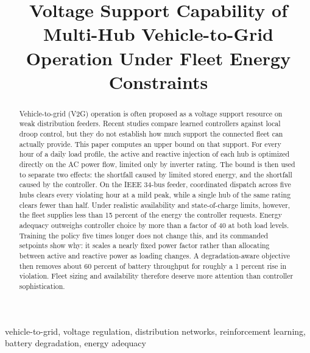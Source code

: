 \documentclass[conference,a4paper]{IEEEtran}
\begin{document}
\title{Voltage Support Capability of Multi-Hub Vehicle-to-Grid Operation Under Fleet
Energy Constraints}

\author{
}

\maketitle

\begin{abstract}
Vehicle-to-grid (V2G) operation is often proposed as a voltage support resource on weak
distribution feeders. Recent studies compare learned controllers against local droop
control, but they do not establish how much support the connected fleet can actually
provide. This paper computes an upper bound on that support. For every hour of a daily
load profile, the active and reactive injection of each hub is optimized directly on the
AC power flow, limited only by inverter rating. The bound is then used to separate two
effects: the shortfall caused by limited stored energy, and the shortfall caused by the
controller. On the IEEE 34-bus feeder, coordinated dispatch across five hubs clears every
violating hour at a mild peak, while a single hub of the same rating clears fewer than
half. Under realistic availability and state-of-charge limits, however, the fleet supplies
less than 15 percent of the energy the controller requests. Energy adequacy outweighs
controller choice by more than a factor of 40 at both load levels. Training the policy
five times longer does not change this, and its commanded setpoints show why: it scales a
nearly fixed power factor rather than allocating between active and reactive power as
loading changes. A degradation-aware objective then removes about 60 percent of battery
throughput for roughly a 1 percent rise in violation. Fleet sizing and availability
therefore deserve more attention than controller sophistication.
\end{abstract}

\begin{IEEEkeywords}
vehicle-to-grid, voltage regulation, distribution networks, reinforcement learning,
battery degradation, energy adequacy
\end{IEEEkeywords}
\end{document}
